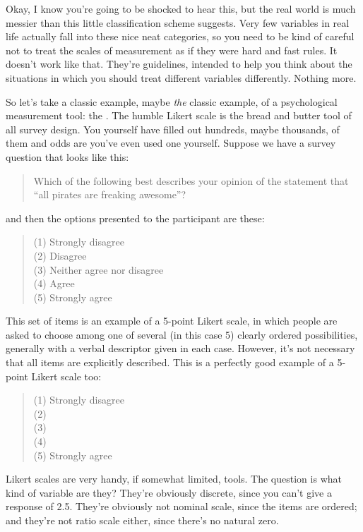 
Okay, I know you're going to be shocked to hear this, but the real world is much messier than this little classification scheme suggests. Very few variables in real life actually fall into these nice neat categories, so you need to be kind of careful not to treat the scales of measurement as if they were hard and fast rules. It doesn't work like that. They're guidelines, intended to help you think about the situations in which you should treat different variables differently. Nothing more. 

So let's take a classic example, maybe {\it the} classic example, of a psychological measurement tool: the . The humble Likert scale is the bread and butter tool of all survey design. You yourself have filled out hundreds, maybe thousands, of them and odds are you've even used one yourself. Suppose we have a survey question that looks like this:

\begin{quote}
Which of the following best describes your opinion of the statement that ``all pirates are freaking awesome''?
\end{quote}
and then the options presented to the participant are these:
\begin{quote}
(1) Strongly disagree\\
(2) Disagree\\
(3) Neither agree nor disagree\\
(4) Agree\\
(5) Strongly agree
\end{quote}
This set of items is an example of a 5-point Likert scale, in which people are asked to choose among one of several (in this case 5) clearly ordered possibilities, generally with a verbal descriptor given in each case. However, it's not necessary that all items are explicitly described. This is a perfectly good example of a 5-point Likert scale too: 
\begin{quote}
(1) Strongly disagree\\
(2) \\ (3) \\ (4) \\
(5) Strongly agree
\end{quote}

Likert scales are very handy, if somewhat limited, tools. The question is what kind of variable are they? They're obviously discrete, since you can't give a response of 2.5. They're obviously not nominal scale, since the items are ordered; and they're not ratio scale either, since there's no natural zero. 

